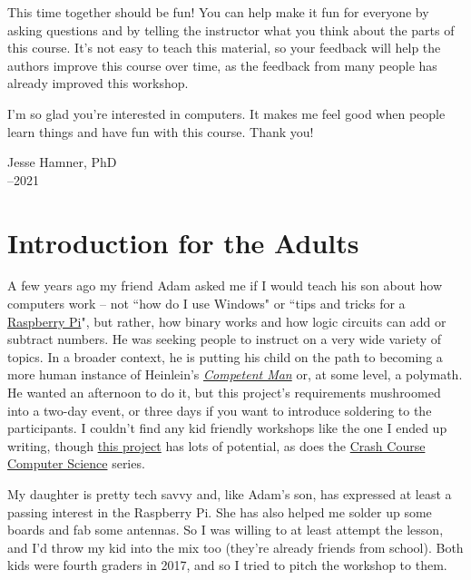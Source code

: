 This time together should be fun! You can help make it fun for everyone by asking questions and by telling the instructor what you think about the parts of this course. It's not easy to teach this material, so your feedback will help the authors improve this course over time, as the feedback from many people has already improved this workshop.

I'm so glad you're interested in computers. It makes me feel good when people learn things and have fun with this course. Thank you!
\bigskip

\noindent Jesse Hamner, PhD\\
--2021\\


\section{Introduction for the Adults}

A few years ago my friend Adam asked me if I would teach his son about how computers work -- not ``how do I use Windows" or ``tips and tricks for a {\color{webblue}\href{https://www.raspberrypi.org}{Raspberry Pi}}", but rather, how binary works and how logic circuits can add or subtract numbers. He was seeking people to instruct on a very wide variety of topics. In a broader context, he is putting his child on the path to becoming a more human instance of Heinlein's {\color{webblue}\href{https://en.wikipedia.org/wiki/Competent_man}{\emph{Competent Man}}} or, at some level, a polymath. He wanted an afternoon to do it, but this project's requirements mushroomed into a two-day event, or three days if you want to introduce soldering to the participants. I couldn't find any kid friendly workshops like the one I ended up writing, though {\color{webblue}\href{https://www.raspberrypi.org/blog/digital-making-curriculum/}{this project}} has lots of potential, as does the {\color{webblue}\href{https://www.youtube.com/playlist?list=PLME-KWdxI8dcaHSzzRsNuOLXtM2Ep_C7a}{Crash Course Computer Science}} series. 

My daughter is pretty tech savvy and, like Adam's son, has expressed at least a passing interest in the Raspberry Pi. She has also helped me solder up some boards and fab some antennas. So I was willing to at least attempt the lesson, and I'd throw my kid into the mix too (they're already friends from school). Both kids were fourth graders in 2017, and so I tried to pitch the workshop to them.

